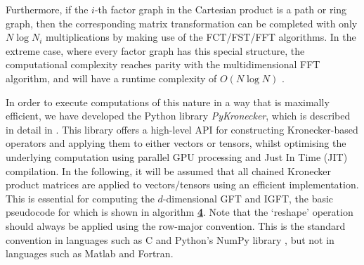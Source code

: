 Furthermore, if the $i$-th factor graph in the Cartesian product is a path or ring graph, then the corresponding matrix transformation can be completed with only $N \log N_i$ multiplications by making use of the FCT/FST/FFT algorithms. In the extreme case, where every factor graph has this special structure, the computational complexity reaches parity with the multidimensional FFT algorithm, and will have a runtime complexity of $O(N \log N)$ \citep{Smith1995}. 

In order to execute computations of this nature in a way that is maximally efficient, we have developed the Python library \textit{PyKronecker}, which is described in detail in \cite{Antonian2023}. This library offers a high-level API for constructing Kronecker-based operators and applying them to either vectors or tensors, whilst optimising the underlying computation using parallel GPU processing and Just In Time (JIT) compilation. In the following, it will be assumed that all chained Kronecker product matrices are applied to vectors/tensors using an efficient implementation. This is essential for computing the $d$-dimensional GFT and IGFT, the basic pseudocode for which is shown in algorithm \hyperlink{al:GFT_dd}{\textbf{4}}. Note that the `reshape' operation should always be applied using the row-major convention. This is the standard convention in languages such as C and Python's NumPy library \citep{Harris2020}, but not in languages such as Matlab and Fortran. 


